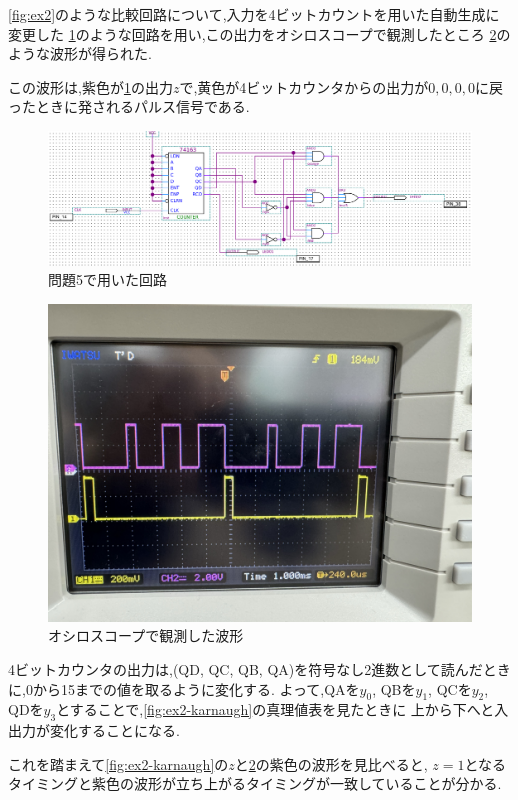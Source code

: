 \documentclass[autodetect-engine, dvi=dvipdfmx, 10pt, a4paper, ja=standard]{bxjsarticle}
\begin{document}
\ref{fig:ex2}のような比較回路について,入力を4ビットカウントを用いた自動生成に変更した
\ref{fig:ex5}のような回路を用い,この出力をオシロスコープで観測したところ
\ref{fig:ex5-osc}のような波形が得られた.

この波形は,紫色が\ref{fig:ex5}の出力$z$で,黄色が4ビットカウンタからの出力が$0,0,0,0$に戻ったときに発されるパルス信号である.

\begin{figure}[htbp]
	\centering
	\includegraphics[width=\columnwidth]{asset/ex5.png}
	\caption{問題5で用いた回路}
	\label{fig:ex5}
\end{figure}

\begin{figure}[htbp]
	\centering
	\includegraphics[width=0.8\columnwidth]{asset/ex5_wave.jpeg}
	\caption{オシロスコープで観測した波形}
	\label{fig:ex5-osc}
\end{figure}


4ビットカウンタの出力は,(QD, QC, QB, QA)を符号なし2進数として読んだときに,0から15までの値を取るように変化する.
よって,QAを$y_0$, QBを$y_1$, QCを$y_2$, QDを$y_3$とすることで,\ref{fig:ex2-karnaugh}の真理値表を見たときに
上から下へと入出力が変化することになる.

これを踏まえて\ref{fig:ex2-karnaugh}の$z$と\ref{fig:ex5-osc}の紫色の波形を見比べると,
$z = 1$となるタイミングと紫色の波形が立ち上がるタイミングが一致していることが分かる.
\end{document}
